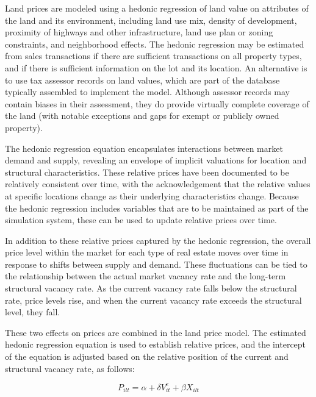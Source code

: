 Land prices are modeled using a hedonic regression of land value
on attributes of the land and its environment, including land use
mix, density of development, proximity of highways and other
infrastructure, land use plan or zoning constraints, and
neighborhood effects.  The hedonic regression may be estimated
from sales transactions if there are sufficient transactions on
all property types, and if there is sufficient information on the
lot and its location.  An alternative is to use tax assessor
records on land values, which are part of the database typically
assembled to implement the model.  Although assessor records may
contain biases in their assessment, they do provide virtually
complete coverage of the land (with notable exceptions and gaps
for exempt or publicly owned property).

The hedonic regression equation encapsulates interactions between
market demand and supply, revealing an envelope of implicit
valuations for location and structural characteristics.  These
relative prices have been documented to be relatively consistent
over time, with the acknowledgement that the relative values at
specific locations change as their underlying characteristics
change.  Because the hedonic
regression includes variables that are to be maintained as part of
the simulation system, these can be used to update relative prices
over time.

In addition to these relative prices captured by the hedonic
regression, the overall price level within the market for each
type of real estate moves over time in response to shifts between
supply and demand.  These fluctuations can be tied to the
relationship between the actual market vacancy rate and the
long-term structural vacancy rate.  As the current vacancy rate
falls below the structural rate, price levels rise, and when the
current vacancy rate exceeds the structural level, they fall.

These two effects on prices are combined in the land price model.
The estimated hedonic regression equation is used to establish
relative prices, and the intercept of the equation is adjusted
based on the relative position of the current and structural
vacancy rate, as follows:


\begin{equation} P_{ilt} =\alpha + \delta V^c_{it} + \beta X_{ilt}
\end{equation}

